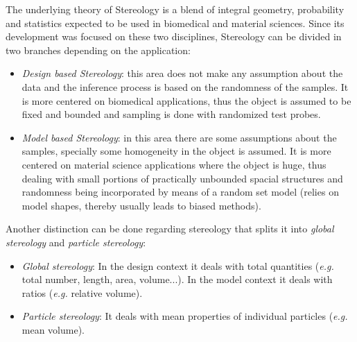 The underlying theory of Stereology is a blend of integral geometry, probability and statistics expected to be used in biomedical and material sciences. Since its development was focused on these two disciplines, Stereology can be divided in two branches depending on the application: 
\begin{itemize}
    \item \textit{Design based Stereology}: this area does not make any assumption about the data and the inference process is based on the randomness of the samples. It is more centered on biomedical applications, thus the object is assumed to be fixed and bounded and sampling is done with randomized test probes.
    \item \textit{Model based Stereology}: in this area there are some assumptions about the samples, specially some homogeneity in the object is assumed. It is more centered on material science applications where the object is huge, thus dealing with small portions of practically unbounded spacial structures and randomness being incorporated by means of a random set model (relies on model shapes, thereby usually leads to biased methods).
\end{itemize}
Another distinction can be done regarding stereology that splits it into \textit{global stereology} and \textit{particle stereology}:
\begin{itemize}
    \item \textit{Global stereology}: In the design context it deals with total quantities (\textit{e.g.} total number, length, area, volume...). In the model context it deals with ratios (\textit{e.g.} relative volume).
    \item \textit{Particle stereology}: It deals with mean properties of individual particles (\textit{e.g.} mean volume).
\end{itemize}

